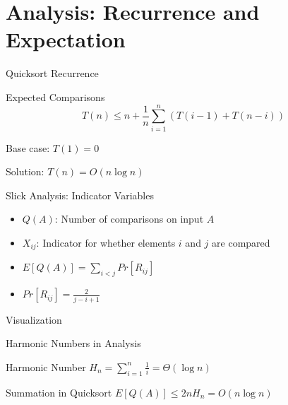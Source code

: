 \documentclass[aspectratio=169]{beamer}
\begin{document}
\section{Analysis: Recurrence and Expectation}
\begin{frame}{Quicksort Recurrence}
  \begin{block}{Expected Comparisons}
    \[
      T(n) \leq n + \frac{1}{n} \sum_{i=1}^n (T(i-1) + T(n-i))
    \]

    Base case: $T(1) = 0$

    Solution: $T(n) = O(n \log n)$
  \end{block}
\end{frame}

\begin{frame}{Slick Analysis: Indicator Variables}
  \begin{itemize}
    \item $Q(A)$: Number of comparisons on input $A$

    \item $X_{ij}$: Indicator for whether elements $i$ and $j$ are compared

    \item $E[Q(A)] = \sum_{i<j} Pr[R_{ij}]$

    \item $Pr[R_{ij}] = \frac{2}{j-i+1}$
  \end{itemize}

  \begin{block}{Visualization}
    \begin{center}
    \end{center}
  \end{block}
\end{frame}

\begin{frame}{Harmonic Numbers in Analysis}
  \begin{block}{Harmonic Number}
    $H_n = \sum_{i=1}^n \frac{1}{i} = \Theta(\log n)$
  \end{block}

  \begin{block}{Summation in Quicksort}
    $E[Q(A)] \leq 2nH_n = O(n \log n)$
  \end{block}
\end{frame}
\end{document}
